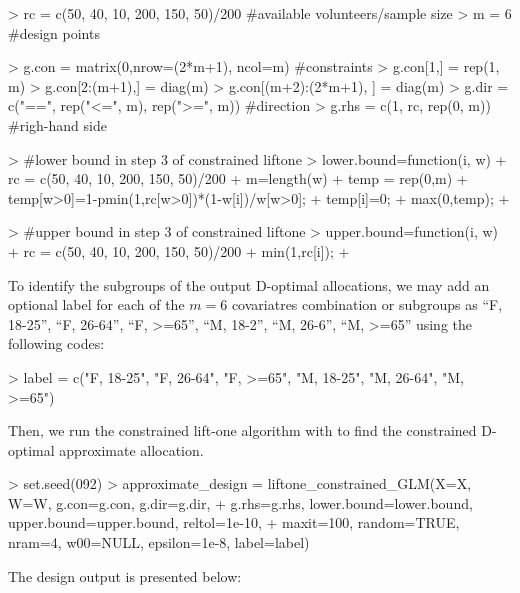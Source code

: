 \begin{example}
  > rc = c(50, 40, 10, 200, 150, 50)/200 #available volunteers/sample size
  > m = 6 #design points

  > g.con = matrix(0,nrow=(2*m+1), ncol=m) #constraints
  > g.con[1,] = rep(1, m)
  > g.con[2:(m+1),] = diag(m)
  > g.con[(m+2):(2*m+1), ] = diag(m)
  > g.dir = c("==", rep("<=", m), rep(">=", m)) #direction
  > g.rhs = c(1, rc, rep(0, m)) #righ-hand side

  > #lower bound in step 3 of constrained liftone
  > lower.bound=function(i, w){
    +   rc = c(50, 40, 10, 200, 150, 50)/200
    +   m=length(w)
    +   temp = rep(0,m)
    +   temp[w>0]=1-pmin(1,rc[w>0])*(1-w[i])/w[w>0];
    +   temp[i]=0;
    +   max(0,temp);
  +   }

  > #upper bound in step 3 of constrained liftone
  > upper.bound=function(i, w){
    +   rc = c(50, 40, 10, 200, 150, 50)/200
    +   min(1,rc[i]);
  +   }
\end{example}

To identify the subgroups of the output D-optimal allocations, we may add an optional label for each of the $m=6$ covariatres combination or subgroups as ``F, 18-25'',  ``F, 26-64'', ``F, >=65'', ``M, 18-2'', ``M, 26-6'', ``M, >=65'' using the following codes:

\begin{example}
  > label = c("F, 18-25", "F, 26-64", "F, >=65", "M, 18-25", "M, 26-64", "M, >=65")
\end{example}

Then, we run the constrained lift-one algorithm with \texttt{} to find the constrained D-optimal approximate allocation.
\begin{example}
  > set.seed(092)
  > approximate_design = liftone_constrained_GLM(X=X, W=W, g.con=g.con, g.dir=g.dir,
    + g.rhs=g.rhs, lower.bound=lower.bound, upper.bound=upper.bound, reltol=1e-10,
  + maxit=100, random=TRUE, nram=4, w00=NULL, epsilon=1e-8, label=label)
\end{example}
The design output is presented below:

